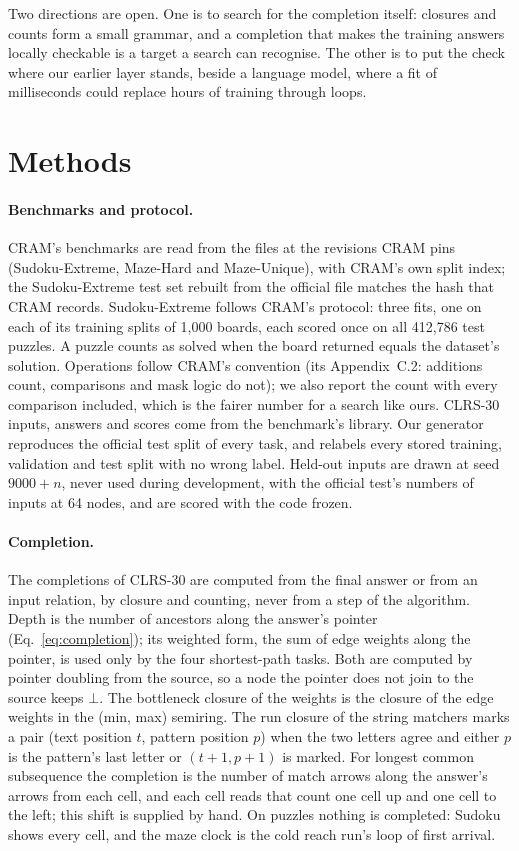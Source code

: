 \documentclass[10pt]{article}
\newcommand{\notyet}{\bot}
\begin{document}
Two directions are open. One is to search for the completion itself: closures and counts form a small grammar, and a
completion that makes the training answers locally checkable is a target a search can recognise. The other is to put
the check where our earlier layer stands, beside a language model, where a fit of milliseconds could replace hours of
training through loops.
\section*{Methods}

\paragraph{Benchmarks and protocol.} CRAM's benchmarks are read from the files at the revisions CRAM pins
(Sudoku-Extreme, Maze-Hard and Maze-Unique), with CRAM's own split index; the Sudoku-Extreme test set rebuilt from the
official file matches the hash that CRAM records. Sudoku-Extreme follows CRAM's protocol: three fits, one on each of its
training splits of 1,000 boards, each scored once on all 412,786 test puzzles. A puzzle
counts as solved when the board returned equals the dataset's solution. Operations follow CRAM's convention (its
Appendix~C.2: additions count, comparisons and mask logic do not); we also report the count with every comparison
included, which is the fairer number for a search like ours. CLRS-30 inputs, answers and scores come from the
benchmark's library\cite{velickovic2022clrs}. Our generator reproduces the official test split of every task, and
relabels every stored training, validation and test split with no wrong label. Held-out inputs are drawn at seed
$9000 + n$, never used during development, with the official test's numbers of inputs at 64 nodes, and are scored with
the code frozen.

\paragraph{Completion.} The completions of CLRS-30 are computed from the final answer or from an input relation, by
closure and counting, never from a step of the algorithm. Depth is the number of ancestors along the answer's pointer
(Eq.~\ref{eq:completion}); its weighted form, the sum of edge weights along the pointer, is used only by the four
shortest-path tasks. Both are computed by pointer doubling from the source, so a node the pointer does not join to
the source keeps $\notyet$. The bottleneck closure of the weights is the closure of the edge weights in the (min, max) semiring. The run
closure of the string matchers marks a pair (text position $t$, pattern position $p$) when the two letters agree and
either $p$ is the pattern's last letter or $(t+1, p+1)$ is marked. For longest common subsequence the completion is the
number of match arrows along the answer's arrows from each cell, and each cell reads that count one cell up and one cell
to the left; this shift is supplied by hand. On puzzles nothing is completed: Sudoku shows every cell, and the maze
clock is the cold reach run's loop of first arrival.
\end{document}
